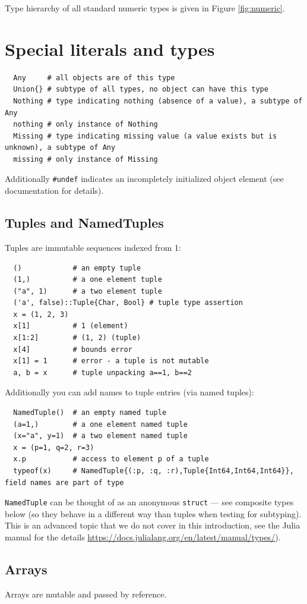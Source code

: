 \documentclass[10pt,a4paper]{article}
\begin{document}
Type hierarchy of all standard numeric types is given in Figure \ref{fig:numeric}.

\section{Special literals and types}
\begin{lstlisting}
  Any     # all objects are of this type
  Union{} # subtype of all types, no object can have this type
  Nothing # type indicating nothing (absence of a value), a subtype of Any
  nothing # only instance of Nothing
  Missing # type indicating missing value (a value exists but is unknown), a subtype of Any
  missing # only instance of Missing
\end{lstlisting}
Additionally \verb|#undef| indicates an incompletely initialized object element
(see documentation for details).

\subsection{Tuples and NamedTuples}
Tuples are immutable sequences indexed from 1:
\begin{lstlisting}
  ()            # an empty tuple
  (1,)          # a one element tuple
  ("a", 1)      # a two element tuple
  ('a', false)::Tuple{Char, Bool} # tuple type assertion
  x = (1, 2, 3)
  x[1]          # 1 (element)
  x[1:2]        # (1, 2) (tuple)
  x[4]          # bounds error
  x[1] = 1      # error - a tuple is not mutable
  a, b = x      # tuple unpacking a==1, b==2
\end{lstlisting}
Additionally you can add names to tuple entries (via named tuples):
\begin{lstlisting}
  NamedTuple()  # an empty named tuple
  (a=1,)        # a one element named tuple
  (x="a", y=1)  # a two element named tuple
  x = (p=1, q=2, r=3)
  x.p           # access to element p of a tuple
  typeof(x)     # NamedTuple{(:p, :q, :r),Tuple{Int64,Int64,Int64}}, field names are part of type
\end{lstlisting}
\lstinline|NamedTuple| can be thought of as an anonymous \lstinline|struct| ---
see composite types below (so they behave in a different way than tuples when
testing for subtyping). This is an advanced topic that we do not cover in this
introduction, see the Julia manual for the details
\url{https://docs.julialang.org/en/latest/manual/types/}).

\subsection{Arrays}
Arrays are mutable and passed by reference.
\end{document}
